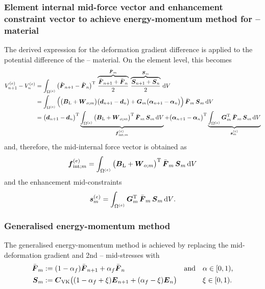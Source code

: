 \subsubsection{Element internal mid-force vector and enhancement constraint
vector to achieve energy-momentum method for
-- material}
The derived expression for the deformation gradient difference is applied to
the potential difference of the --
material. On the element level, this becomes
\begin{equation}
\begin{split}
   V_{n+1}^{(e)} - V_n^{(e)}
&  = \int_{\Omega^{(e)}} 
   \big( \tilde{\boldsymbol{F}}_{n+1} - \tilde{\boldsymbol{F}}_n \big)^{\mathrm{T}}
   \, \overbrace{\frac{\bar{\boldsymbol{F}}_{n+1} + \bar{\boldsymbol{F}}_n}{2}}^{\bar{\boldsymbol{F}}_m}
   \, \overbrace{\frac{\boldsymbol{S}_{n+1} + \boldsymbol{S}_n}{2}}^{\boldsymbol{S}_m}
   \, \mathrm{d} V
\\
&  = \int_{\Omega^{(e)}} 
   \Big( \big( \boldsymbol{B}_{\text{L}} + \boldsymbol{W}_{o;m} \big)
         \big( \boldsymbol{d}_{n+1} - \boldsymbol{d}_n \big)
         + \boldsymbol{G}_m \big( \boldsymbol{\alpha}_{n+1} - \boldsymbol{\alpha}_n \big) \Big)
   \, \bar{\boldsymbol{F}}_m \, \boldsymbol{S}_m \, \mathrm{d} V
\\
&  = \big( \boldsymbol{d}_{n+1} - \boldsymbol{d}_n \big)^{\mathrm{T}}
   \underbrace{\int_{\Omega^{(e)}} \big( \boldsymbol{B}_{\text{L}} + \boldsymbol{W}_{o;m} \big)^{\mathrm{T}}
   \, \bar{\boldsymbol{F}}_m \, \boldsymbol{S}_m \, \mathrm{d} V}_{\boldsymbol{f}_{\text{int};m}^{(e)}}
   + \big( \boldsymbol{\alpha}_{n+1} - \boldsymbol{\alpha}_n \big)^{\mathrm{T}}
   \underbrace{\int_{\Omega^{(e)}} \boldsymbol{G}_m^{\mathrm{T}} \, \bar{\boldsymbol{F}}_m \, \boldsymbol{S}_m \, \mathrm{d} V}_{\boldsymbol{s}_{m}^{(e)}}
\end{split}   
\end{equation}
and, therefore, the mid-internal force vector is obtained as
\begin{equation}
   \boldsymbol{f}_{\text{int};m}^{(e)}
   = \int_{\Omega^{(e)}} \big( \boldsymbol{B}_{\text{L}} + \boldsymbol{W}_{o;m} \big)^{\mathrm{T}}
   \, \bar{\boldsymbol{F}}_m \, \boldsymbol{S}_m \, \mathrm{d} V
\end{equation}
and the enhancement mid-constraints
\begin{equation}
   \boldsymbol{s}_{m}^{(e)}
   = \int_{\Omega^{(e)}} \boldsymbol{G}_m^{\mathrm{T}} \, \bar{\boldsymbol{F}}_m \, \boldsymbol{S}_m \, \mathrm{d} V
   \text{.}
\end{equation}

\subsubsection{Generalised energy-momentum method}
The generalised energy-momentum method is achieved by replacing the
mid-deformation gradient and 2nd -- mid-stresses
with 
\begin{equation}
\begin{aligned}
   \bar{\boldsymbol{F}}_m
&  := (1-\alpha_f) \bar{\boldsymbol{F}}_{n+1} + \alpha_f \bar{\boldsymbol{F}}_n
&& \text{and}
&&  \alpha\in[0,1)
   \text{,}
\\
   \boldsymbol{S}_m
&  := \boldsymbol{C}_{\text{VK}} \big( (1-\alpha_f+\xi)\boldsymbol{E}_{n+1} +
(\alpha_f-\xi)\boldsymbol{E}_{n} \big)
&&
&& \xi\in[0,1)
   \text{.}
\end{aligned}
\end{equation}

